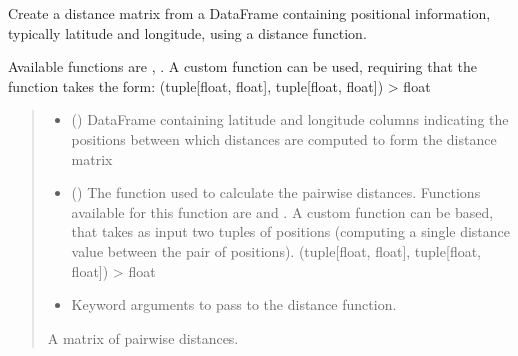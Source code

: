 \documentclass[letterpaper,10pt,english]{sphinxmanual}
\begin{document}
\begin{fulllineitems}
\label{\detokenize{misc:glomar_gridding.distances.calculate_distance_matrix}}
\pysigstartsignatures
\pysiglinewithargsret
{}
{\sphinxparamcomma {}\sphinxparamcomma {}}
{}
\pysigstopsignatures
\sphinxAtStartPar
Create a distance matrix from a DataFrame containing positional information,
typically latitude and longitude, using a distance function.

\sphinxAtStartPar
Available functions are , . A
custom function can be used, requiring that the function takes the form:
(tuple{[}float, float{]}, tuple{[}float, float{]}) \sphinxhyphen{}\textgreater{} float
\begin{quote}\begin{description}
\begin{itemize}
\item {}
\sphinxAtStartPar
{} () \textendash{} DataFrame containing latitude and longitude columns indicating the
positions between which distances are computed to form the distance
matrix

\item {}
\sphinxAtStartPar
{} () \textendash{} The function used to calculate the pairwise distances. Functions
available for this function are  and
.
A custom function can be based, that takes as input two tuples of
positions (computing a single distance value between the pair of
positions). (tuple{[}float, float{]}, tuple{[}float, float{]}) \sphinxhyphen{}\textgreater{} float

\item {}
\sphinxAtStartPar
{} \textendash{} Keyword arguments to pass to the distance function.

\end{itemize}

\sphinxAtStartPar
{} \textendash{} A matrix of pairwise distances.

\sphinxAtStartPar
{}

\end{description}\end{quote}

\end{fulllineitems}
\end{document}
